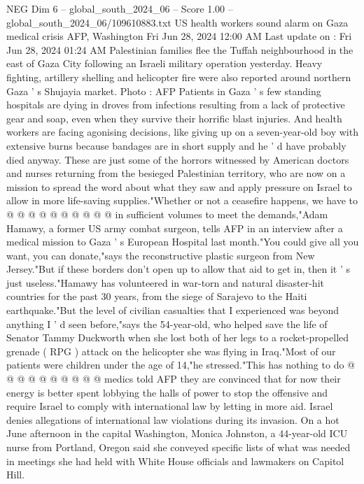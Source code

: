\begin{textsample}{NEG Dim 6 – global\_south\_2024\_06 – Score 1.00 – global\_south\_2024\_06/109610883.txt}  \label{ex:f6_neg_270}
US health workers sound alarm on Gaza medical crisis AFP, Washington Fri Jun 28, 2024 12:00 AM Last update on : Fri Jun 28, 2024 01:24 AM Palestinian families flee the Tuffah neighbourhood in the east of Gaza City following an Israeli military operation yesterday.
Heavy fighting, artillery shelling and helicopter fire were also reported around northern Gaza ' s Shujayia market.
Photo : AFP Patients in Gaza ' s few standing hospitals are dying in droves from infections resulting from a lack of protective gear and soap, even when they survive their horrific blast injuries.
And health workers are facing agonising decisions, like giving up on a seven-year-old boy with extensive burns because bandages are in short supply and he ' d have probably died anyway.
These are just some of the horrors witnessed by American doctors and nurses returning from the besieged Palestinian territory, who are now on a mission to spread the word about what they saw and apply pressure on Israel to allow in more life-saving supplies."Whether or not a ceasefire happens, we have to @ @ @ @ @ @ @ @ @ @ in sufficient volumes to meet the demands,"Adam Hamawy, a former US army combat surgeon, tells AFP in an interview after a medical mission to Gaza ' s European Hospital last month."You could give all you want, you can donate,"says the reconstructive plastic surgeon from New Jersey."But if these borders don't open up to allow that aid to get in, then it ' s just useless."Hamawy has volunteered in war-torn and natural disaster-hit countries for the past 30 years, from the siege of Sarajevo to the Haiti earthquake."But the level of civilian casualties that I experienced was beyond anything I ' d seen before,"says the 54-year-old, who helped save the life of Senator Tammy Duckworth when she lost both of her legs to a rocket-propelled grenade ( RPG ) attack on the helicopter she was flying in Iraq."Most of our patients were children under the age of 14,"he stressed."This has nothing to do @ @ @ @ @ @ @ @ @ @ medics told AFP they are convinced that for now their energy is better spent lobbying the halls of power to stop the offensive and require Israel to comply with international law by letting in more aid.
Israel denies allegations of international law violations during its invasion.
On a hot June afternoon in the capital Washington, Monica Johnston, a 44-year-old ICU nurse from Portland, Oregon said she conveyed specific lists of what was needed in meetings she had held with White House officials and lawmakers on Capitol Hill.

\end{textsample}
